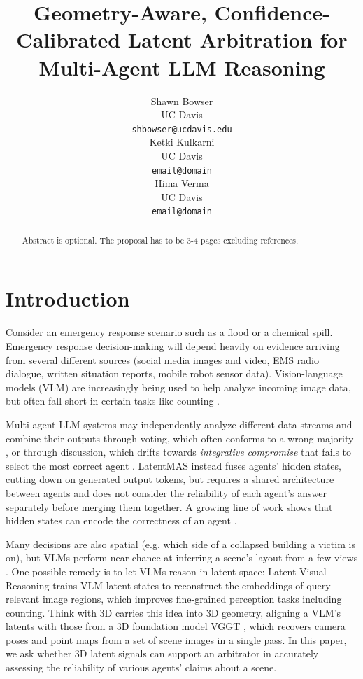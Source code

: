 \documentclass[11pt]{article}
\title{Geometry-Aware, Confidence-Calibrated Latent Arbitration for Multi-Agent LLM Reasoning}
\author{Shawn Bowser \\
  UC Davis \\
  \texttt{shbowser@ucdavis.edu} \\\And
  Ketki Kulkarni \\
  UC Davis \\
  \texttt{email@domain} \\ \And
  Hima Verma \\
  UC Davis \\
  \texttt{email@domain}\\}
\begin{document}
\maketitle
\begin{abstract}
Abstract is optional. The proposal has to be 3-4 pages excluding references.
\end{abstract}

\section{Introduction}

Consider an emergency response scenario such as a flood or a chemical spill. Emergency response decision-making will depend heavily on evidence arriving from several different sources (social media images and video, EMS radio dialogue, written situation reports, mobile robot sensor data). Vision-language models (VLM) are increasingly being used to help analyze incoming image data, but often fall short in certain tasks like counting \cite{ge-etal-2026-emsdialog, al_mohannadi_2026_20306919}.

Multi-agent LLM systems may independently analyze different data streams and combine their outputs through voting, which often conforms to a wrong majority \cite{ICLR2025_1da9ca7e}, or through discussion, which drifts towards \textit{integrative compromise} that fails to select the most correct agent \cite{groupthink2026}. LatentMAS \cite{pmlr-v306-zou26k} instead fuses agents' hidden states, cutting down on generated output tokens, but requires a shared architecture between agents and does not consider the reliability of each agent's answer separately before merging them together. A growing line of work shows that hidden states can encode the correctness of an agent \cite{khanmohammadi-etal-2025-calibrating, pmlr-v306-xiao26l}.

Many decisions are also spatial (e.g. which side of a collapsed building a victim is on), but VLMs perform near chance at inferring a scene's layout from a few views \cite{wang2025mindcube}. One possible remedy is to let VLMs reason in latent space: Latent Visual Reasoning \cite{li2026latent} trains VLM latent states to reconstruct the embeddings of query-relevant image regions, which improves fine-grained perception tasks including counting. Think with 3D \cite{chen2026think} carries this idea into 3D geometry, aligning a VLM's latents with those from a 3D foundation model VGGT \cite{wang2025vggt}, which recovers camera poses and point maps from a set of scene images in a single pass. In this paper, we ask whether 3D latent signals can support an arbitrator in accurately assessing the reliability of various agents' claims about a scene.
\end{document}
